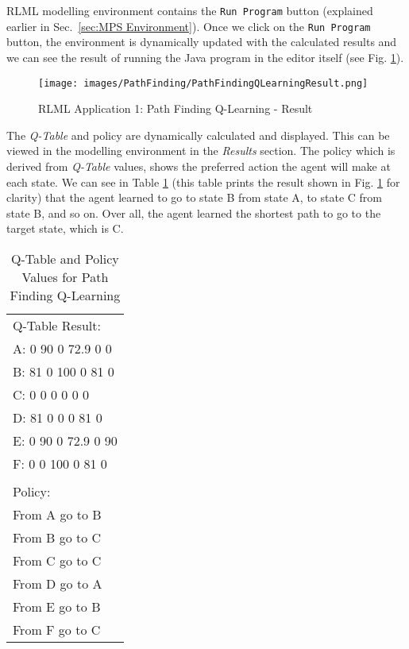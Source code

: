 \documentclass[11pt,letterpaper]{ryersonSGSThesis}
\begin{document}
\begin{ryersonSGSThesis}
    RLML modelling environment contains the \texttt{Run Program} button (explained earlier in Sec.~\ref{sec:MPS Environment}). Once we click on the \texttt{Run Program} button, the environment is dynamically updated with the calculated results and we can see the result of running the Java program in the editor itself (see Fig. \ref{fig:PathFindingQLearningResult}). 
    
    \begin{figure}[!tbh]
        \centering
        \texttt{[image: images/PathFinding/PathFindingQLearningResult.png]}
        \caption{RLML Application 1: Path Finding Q-Learning - Result}
        \label{fig:PathFindingQLearningResult}
    \end{figure}
    
    The \emph{Q-Table} and policy are dynamically calculated and displayed. This can be viewed in the modelling environment in the \emph{Results} section. The policy which is derived from \emph{Q-Table} values, shows the preferred action the agent will make at each state. We can see in Table \ref{table:PathFindingQLearningQTablePolicy} (this table prints the result shown in Fig. \ref{fig:PathFindingQLearningResult} for clarity) that the agent learned to go to state B from state A, to state C from state B, and so on. Over all, the agent learned the shortest path to go to the target state, which is C.
    
    \begin{table}[h!]
    \centering
    \begin{tabular}{|l|} 
        \hline
        Q-Table Result: \\
        A:  0 90 0 72.9 0 0 \\ 
        B:  81 0 100 0 81 0 \\
        C:  0 0 0 0 0 0  \\
        D:  81 0 0 0 81 0 \\
        E:  0 90 0 72.9 0 90 \\ 
        F:  0 0 100 0 81 0 \\
        \\
        Policy: \\
        From A go to B \\
        From B go to C \\
        From C go to C \\
        From D go to A \\
        From E go to B \\
        From F go to C \\ [1ex]
        \hline
    \end{tabular}
    \caption{Q-Table and Policy Values for Path Finding Q-Learning} \label{table:PathFindingQLearningQTablePolicy}
    \end{table}
    

\end{ryersonSGSThesis}
\end{document}
